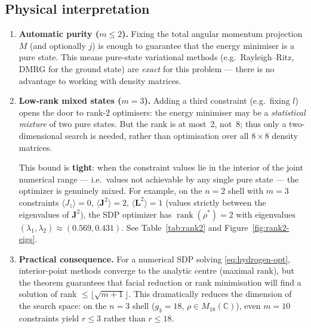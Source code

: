 \documentclass[11pt,a4paper]{article}
\theoremstyle{definition}
\newcommand{\rank}{\operatorname{rank}}
\begin{document}
\subsection{Physical interpretation}

\begin{enumerate}
\item \textbf{Automatic purity ($m \leq 2$).}  Fixing the total
  angular momentum projection $M$ (and optionally $j$) is enough to
  guarantee that the energy minimiser is a pure state.  This means
  pure-state variational methods (e.g.\ Rayleigh--Ritz, DMRG for the
  ground state) are \emph{exact} for this problem --- there is no
  advantage to working with density matrices.

\item \textbf{Low-rank mixed states ($m = 3$).}  Adding a third
  constraint (e.g.\ fixing $l$) opens the door to rank-$2$ optimisers:
  the energy minimiser may be a \emph{statistical mixture} of two pure
  states.  But the rank is at most~2, not~8; thus only a
  two-dimensional search is needed, rather than optimisation over all
  $8 \times 8$ density matrices.

  This bound is \textbf{tight}: when the constraint values lie in
  the interior of the joint numerical range --- i.e.\ values not
  achievable by any single pure state --- the optimizer is genuinely
  mixed.  For example, on the $n = 2$ shell with $m = 3$ constraints
  $\langle J_z \rangle = 0$, $\langle \mathbf{J}^2 \rangle = 2$,
  $\langle \mathbf{L}^2 \rangle = 1$ (values strictly between the
  eigenvalues of $\mathbf{J}^2$), the SDP optimizer has
  $\rank(\rho^*) = 2$ with eigenvalues
  $(\lambda_1, \lambda_2) \approx (0.569, 0.431)$.  See
  Table~\ref{tab:rank2} and Figure~\ref{fig:rank2-eigs}.

\item \textbf{Practical consequence.}  For a numerical SDP solving
  \eqref{eq:hydrogen-opt}, interior-point methods converge to the
  analytic centre (maximal rank), but the theorem guarantees that
  facial reduction or rank minimisation will find a solution of rank
  $\leq \lfloor\sqrt{m+1}\rfloor$.  This dramatically reduces the
  dimension of the search space: on the $n = 3$ shell ($g_3 = 18$,
  $\rho \in M_{18}(\mathbb{C})$), even $m = 10$ constraints yield
  $r \leq 3$ rather than $r \leq 18$.
\end{enumerate}
\end{document}
